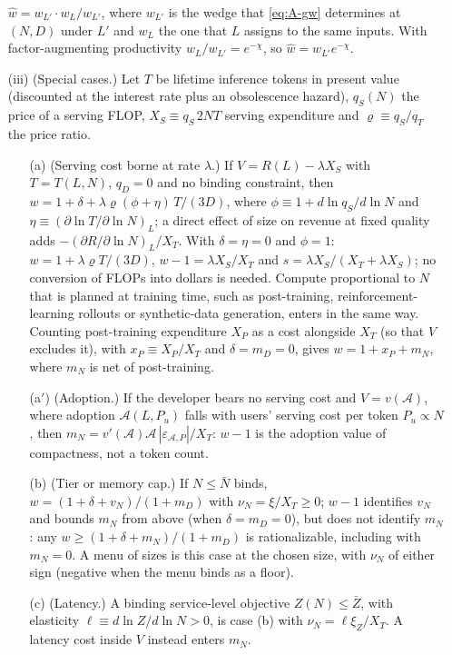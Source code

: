 \begin{proposition}
\begin{enumerate}
$\hat w=w_{L'}\cdot w_L/w_{L'}$, where $w_{L'}$ is the wedge that \eqref{eq:A-gw} determines at $(N,D)$ under $L'$ and
$w_L$ the one that $L$ assigns to the same inputs. With factor-augmenting productivity $w_L/w_{L'}=e^{-\chi}$, so
$\hat w=w_{L'}e^{-\chi}$.
\item[(iii)] (Special cases.) Let $T$ be lifetime inference tokens in present value (discounted at the interest rate plus
an obsolescence hazard), $q_S(N)$ the price of a serving FLOP, $X_S\equiv q_S\,2NT$ serving expenditure and
$\varrho\equiv q_S/q_T$ the price ratio.
\begin{enumerate}
\item[(a)] (Serving cost borne at rate $\lambda$.) If $V=R(L)-\lambda X_S$ with $T=T(L,N)$, $q_D=0$ and no binding
constraint, then
$w=1+\delta+\lambda\varrho(\phi+\eta)\,T/(3D)$, where $\phi\equiv1+d\ln q_S/d\ln N$ and
$\eta\equiv(\partial\ln T/\partial\ln N)_L$; a direct effect of size on revenue at fixed quality adds
$-(\partial R/\partial\ln N)_L/X_T$. With $\delta=\eta=0$ and $\phi=1$: $w=1+\lambda\varrho T/(3D)$, $w-1=\lambda X_S/X_T$
and $s=\lambda X_S/(X_T+\lambda X_S)$; no conversion of FLOPs into dollars is needed. Compute proportional to $N$ that is
planned at training time, such as post-training, reinforcement-learning rollouts or synthetic-data generation, enters in
the same way. Counting post-training expenditure $X_P$ as a cost alongside $X_T$ (so that $V$ excludes it), with
$x_P\equiv X_P/X_T$ and $\delta=m_D=0$, gives $w=1+x_P+m_N$, where $m_N$ is net of post-training.
\item[(a$'$)] (Adoption.) If the developer bears no serving cost and $V=v(\mathcal A)$, where adoption $\mathcal A(L,P_u)$
falls with users' serving cost per token $P_u\propto N$, then $m_N=v'(\mathcal A)\mathcal A\,|\varepsilon_{\mathcal
A,P}|/X_T$: $w-1$ is the adoption value of compactness, not a token count.
\item[(b)] (Tier or memory cap.) If $N\le\bar N$ binds, $w=(1+\delta+v_N)/(1+m_D)$ with $\nu_N=\xi/X_T\ge0$; $w-1$
identifies $v_N$ and bounds $m_N$ from above (when $\delta=m_D=0$), but does not identify $m_N$: any
$w\ge(1+\delta+m_N)/(1+m_D)$ is rationalizable, including with $m_N=0$. A menu of sizes is this case at the chosen size,
with $\nu_N$ of either sign (negative when the menu binds as a floor).
\item[(c)] (Latency.) A binding service-level objective $Z(N)\le\bar Z$, with elasticity $\ell\equiv d\ln Z/d\ln N>0$,
is case (b) with $\nu_N=\ell\xi_Z/X_T$. A latency cost inside $V$ instead enters $m_N$.

\end{enumerate}
\end{enumerate}
\end{proposition}

